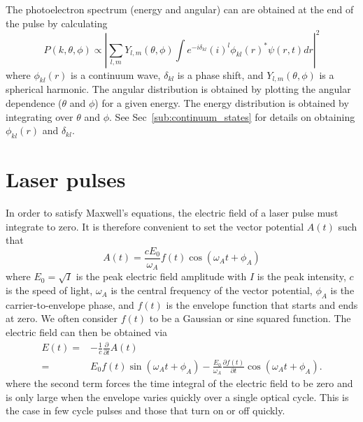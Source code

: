 The photoelectron spectrum (energy and angular) can are obtained at the end of the pulse by calculating
\begin{equation}
    P(k,\theta,\phi) \propto \left|\sum_{l,m} Y_{l,m}(\theta,\phi)\int  e^{-i\delta_{kl}}(i)^l \phi_{kl}(r)^* \psi(r,t) dr \right|^2
\end{equation}
where $\phi_{kl}(r)$ is a continuum wave, $\delta_{kl}$ is a phase shift, and $Y_{l,m}(\theta,\phi)$ is a spherical harmonic. The angular distribution is obtained by plotting the angular dependence ($\theta$ and $\phi$) for a given energy. The energy distribution is obtained by integrating over $\theta$ and $\phi$. See Sec~\ref{sub:continuum_states} for details on obtaining $\phi_{kl}(r)$ and $\delta_{kl}$.



\section{Laser pulses} %
\label{sec:laser_pulses}
In order to satisfy Maxwell's equations, the electric field of a laser pulse must integrate to zero. It is therefore convenient to set the vector potential $A(t)$ such that 
\begin{equation}
    A(t) = \frac{c E_0}{\omega_A}f(t) \cos(\omega_A t +\phi_A)
\end{equation}
where $E_0=\sqrt{I}$ is the peak electric field amplitude with $I$ is the peak intensity, $c$ is the speed of light, $\omega_A$ is the central frequency of the vector potential, $\phi_A$ is the carrier-to-envelope phase, and $f(t)$ is the envelope function that starts and ends at zero. We often consider $f(t)$ to be a Gaussian or sine squared function. The electric field can then be obtained via
\begin{equation}
\begin{split}
\label{eq:efield}
E(t) =& -\frac{1}{c}\frac{\partial}{\partial t}A(t)
\\
=&E_0f(t) \sin(\omega_A t +\phi_A)
-\frac{E_0}{\omega_A}\frac{\partial f(t)}{\partial t}
\cos(\omega_A t +\phi_A).
\end{split}
\end{equation}
where the second term forces the time integral of the electric field to be zero and is only large when the envelope varies quickly over a single optical cycle. This is the case in few cycle pulses and those that turn on or off quickly.

